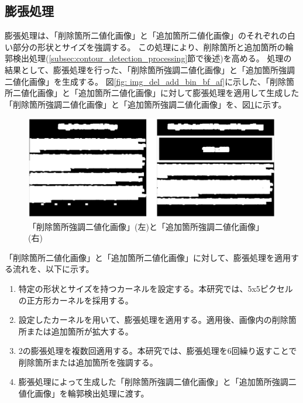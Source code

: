 \subsection{膨張処理}\label{subsec:dilation}
膨張処理は、「削除箇所二値化画像」と「追加箇所二値化画像」のそれぞれの白い部分の形状とサイズを強調する。
この処理により、削除箇所と追加箇所の輪郭検出処理(\ref{subsec:contour_detection_processing}節で後述)を高める。
処理の結果として、膨張処理を行った、「削除箇所強調二値化画像」と「追加箇所強調二値化画像」を生成する。
図\ref{fig: img_del_add_bin_bf_af}に示した、「削除箇所二値化画像」と「追加箇所二値化画像」に対して膨張処理を適用して生成した「削除箇所強調二値化画像」と「追加箇所強調二値化画像」を、図\ref{fig: img_del_add_highlight_bin}に示す。
\begin{figure}[tp]
    \begin{center}
        \includegraphics[width=1.0\columnwidth]{image/4_img_del_add_highlight_bin.png}
        \caption{「削除箇所強調二値化画像」(左)と「追加箇所強調二値化画像」(右)}
        \label{fig: img_del_add_highlight_bin}
    \end{center}
\end{figure}
\par
「削除箇所二値化画像」と「追加箇所二値化画像」に対して、膨張処理を適用する流れを、以下に示す。
\begin{enumerate}
    \item 特定の形状とサイズを持つカーネルを設定する。本研究では、5x5ピクセルの正方形カーネルを採用する。
    \item 設定したカーネルを用いて、膨張処理を適用する。適用後、画像内の削除箇所または追加箇所が拡大する。
    \item 2の膨張処理を複数回適用する。本研究では、膨張処理を6回繰り返すことで削除箇所または追加箇所を強調する。
    \item 膨張処理によって生成した「削除箇所強調二値化画像」と「追加箇所強調二値化画像」を輪郭検出処理に渡す。
\end{enumerate}

